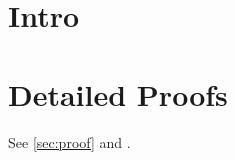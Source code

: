 \documentclass{wrapper}
\begin{document}
\wrapperclass\articleclass\layoutmode\hypermode
\tableofcontents
\section{Intro}
\appendix
\section{Detailed Proofs}\label{sec:proof}
See \autoref{sec:proof} and .
\end{document}
